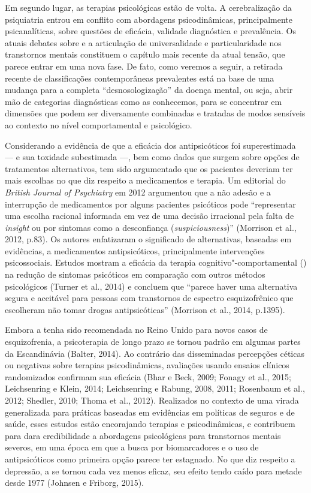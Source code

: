 Em segundo lugar, as terapias psicológicas estão de volta. A
cerebralização da psiquiatria entrou em conflito com abordagens
psicodinâmicas, principalmente psicanalíticas, sobre questões de
eficácia, validade diagnóstica e prevalência. Os atuais debates sobre
 e a articulação de universalidade e particularidade nos transtornos
mentais constituem o capítulo mais recente da atual tensão, que parece
entrar em uma nova fase. De fato, como veremos a seguir, a retirada
recente de classificações contemporâneas prevalentes está na base de uma
mudança para a completa ``desnosologização'' da doença mental, ou seja,
abrir mão de categorias diagnósticas como as conhecemos, para se
concentrar em dimensões que podem ser diversamente combinadas e tratadas
de modos sensíveis ao contexto no nível comportamental e psicológico.

Considerando a evidência de que a eficácia dos antipsicóticos foi
superestimada --- e sua toxidade subestimada ---, bem como dados que
surgem sobre opções de tratamentos alternativos, tem sido argumentado
que os pacientes deveriam ter mais escolhas no que diz respeito a
medicamentos e terapia. Um editorial do \emph{British Journal of
Psychiatry} em 2012 argumentou que a não adesão e a interrupção de
medicamentos por alguns pacientes psicóticos pode ``representar uma
escolha racional informada em vez de uma decisão irracional pela falta
de \emph{insight} ou por sintomas como a desconfiança
(\emph{suspiciousness})'' (Morrison et al., 2012, p.83). Os autores
enfatizaram o significado de alternativas, baseadas em evidências, a
medicamentos antipsicóticos, principalmente intervenções psicossociais.
Estudos mostram a eficácia da terapia cognitivo"-comportamental () na
redução de sintomas psicóticos em comparação com outros métodos
psicológicos (Turner et al., 2014) e concluem que ``parece haver uma
alternativa segura e aceitável para pessoas com transtornos de espectro
esquizofrênico que escolheram não tomar drogas antipsicóticas''
(Morrison et al., 2014, p.1395).

Embora a  tenha sido recomendada no Reino Unido para novos casos de
esquizofrenia, a psicoterapia de longo prazo se tornou padrão em algumas
partes da Escandinávia (Balter, 2014). Ao contrário das disseminadas
percepções céticas ou negativas sobre terapias psicodinâmicas,
avaliações usando ensaios clínicos randomizados confirmam sua eficácia
(Bhar e Beck, 2009; Fonagy et al., 2015; Leichsenring e Klein, 2014;
Leichsenring e Rabung, 2008, 2011; Rosenbaum et al., 2012; Shedler,
2010; Thoma et al., 2012). Realizados no contexto de uma virada
generalizada para práticas baseadas em evidências em políticas de
seguros e de saúde, esses estudos estão encorajando terapias  e
psicodinâmicas, e contribuem para dara credibilidade a abordagens
psicológicas para transtornos mentais severos, em uma época em que a
busca por biomarcadores e o uso de antipsicóticos como primeira opção
parece ter estagnado. No que diz respeito a depressão, a  se tornou
cada vez menos eficaz, seu efeito tendo caído para metade desde 1977
(Johnsen e Friborg, 2015).

